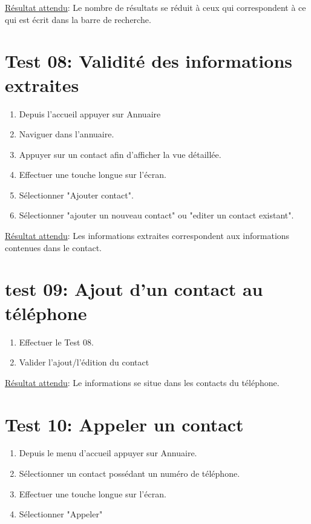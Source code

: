 \documentclass [pdftex,12pt] {report}
\begin{document}
    \underline{Résultat attendu}: Le nombre de résultats se réduit à ceux qui correspondent à ce qui est écrit dans la barre de recherche.

  \section{Test 08: Validité des informations extraites}
    \begin{enumerate}
    \item Depuis l'accueil appuyer sur Annuaire
    \item Naviguer dans l'annuaire.
    \item Appuyer sur un contact afin d'afficher la vue détaillée.
    \item Effectuer une touche longue sur l'écran.
    \item Sélectionner "Ajouter contact".
    \item Sélectionner "ajouter un nouveau contact" ou "editer un contact existant".
    \end{enumerate}

    \underline{Résultat attendu}: Les informations extraites correspondent aux informations contenues dans le contact.

  \section{test 09: Ajout d'un contact au téléphone}
    \begin{enumerate}
    \item Effectuer le Test 08.
    \item Valider l'ajout/l'édition du contact
    \end{enumerate}

    \underline{Résultat attendu}: Le informations se situe dans les contacts du téléphone.

  \section{Test 10: Appeler un contact}
    \begin{enumerate}
    \item Depuis le menu d'accueil appuyer sur Annuaire.
    \item Sélectionner un contact possédant un numéro de téléphone.
    \item Effectuer une touche longue sur l'écran.
    \item Sélectionner "Appeler"
    \end{enumerate}
\end{document}

